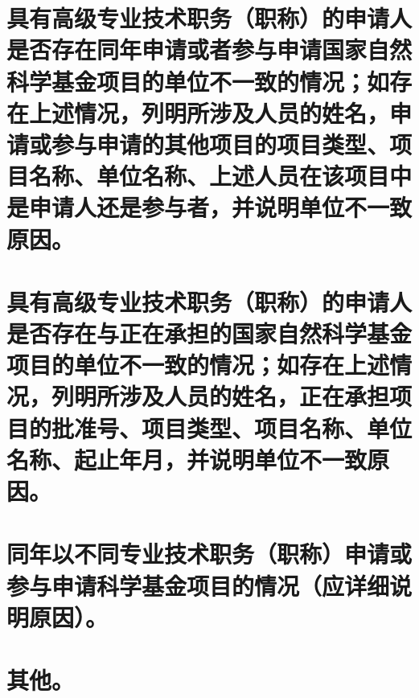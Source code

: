 \documentclass[UTF8, punct, oneside, fontset=none]{ctexbook}
\begin{document}
\begin{MS}
	
\end{MS}

\section{具有高级专业技术职务（职称）的申请人是否存在同年申请或者参与申请国家自然科学基金项目的单位不一致的情况；如存在上述情况，列明所涉及人员的姓名，申请或参与申请的其他项目的项目类型、\kg{-0.1em}项目名称、\kg{-0.1em}单位名称、\kg{-0.1em}上述人员在该项目中是申请人还是参与者，并说明单位不一致原因。}

\begin{MS}
	
\end{MS}

\section{具有高级专业技术职务（职称）的申请人是否存在与正在承担的国家自然科学基金项目的单位不一致的情况；如存在上述情况，列明所涉及人员的姓名，\kg{-0.1em}正在承担项目的批准号、\kg{-0.1em}项目类型、\kg{-0.1em}项目名称、单位名称、起止年月，并说明单位不一致原因。}

\begin{MS}
	
\end{MS}

\section{同年以不同专业技术职务（职称）申请或参与申请科学基金项目的情况（应详细说明原因）。}

\begin{MS}
	
\end{MS}


\section{其他。}

\begin{MS}
	
\end{MS}
\end{document}
